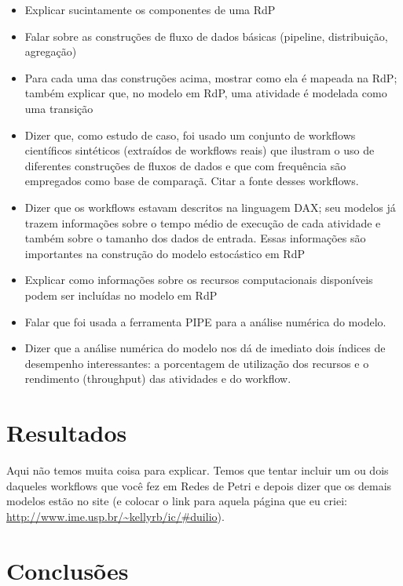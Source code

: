 \documentclass[a4paper,10pt]{article}
\begin{document}
\begin{itemize}
\item Explicar sucintamente os componentes de uma RdP
\item Falar sobre as construções de fluxo de dados básicas (pipeline, distribuição, agregação)
\item Para cada uma das construções acima, mostrar como ela é mapeada na RdP; também explicar que, no modelo em RdP, uma atividade é modelada como uma transição
\item Dizer que, como estudo de caso, foi usado um conjunto de workflows científicos sintéticos (extraídos de workflows reais) que ilustram o uso de diferentes construções de fluxos de dados e que com frequência são empregados como base de comparaçã. Citar a fonte desses workflows.  
\item Dizer que os workflows estavam descritos na linguagem DAX; seu modelos já trazem informações sobre o tempo médio de execução de cada atividade e também sobre o tamanho dos dados de entrada. Essas informações são importantes na construção do modelo estocástico em RdP
\item Explicar como informações sobre os recursos computacionais disponíveis podem ser incluídas no modelo em RdP
\item Falar que foi usada a ferramenta PIPE para a análise numérica do modelo.
\item Dizer que a análise numérica do modelo nos dá de imediato dois índices de desempenho interessantes: a porcentagem de utilização dos recursos e o rendimento (throughput) das atividades e do workflow.    
\end{itemize}
\section*{Resultados}

Aqui não temos muita coisa para explicar.
Temos que tentar incluir um ou dois daqueles workflows que você fez em Redes de Petri e depois dizer que os demais modelos estão no site (e colocar o link para aquela página que eu criei: \url{http://www.ime.usp.br/~kellyrb/ic/#duilio}).

\section*{Conclusões}
\end{document}
